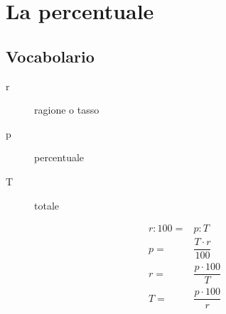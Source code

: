 \chapter{La percentuale}
\section{Vocabolario}
\begin{description}
	\item[r] ragione o tasso
	\item[p] percentuale
	\item[T] totale
\end{description}
\begin{align}
r:100=&p:T\\
p=&\dfrac{T\cdot r}{100}\\
r=&\dfrac{p\cdot100}{T}\\
T=&\dfrac{p\cdot100}{r}\\
\end{align}